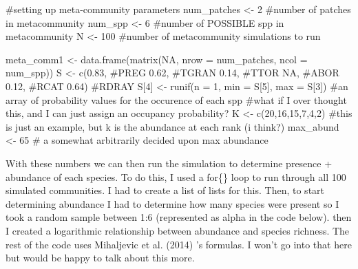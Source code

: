 \documentclass[
  letterpaper,
  DIV=11,
  numbers=noendperiod]{scrartcl}
\newenvironment{Shaded}{\begin{snugshade}}{\end{snugshade}}
\newcommand{\AttributeTok}[1]{\textcolor[rgb]{0.40,0.45,0.13}{#1}}
\newcommand{\CommentTok}[1]{\textcolor[rgb]{0.37,0.37,0.37}{#1}}
\newcommand{\ConstantTok}[1]{\textcolor[rgb]{0.56,0.35,0.01}{#1}}
\newcommand{\DecValTok}[1]{\textcolor[rgb]{0.68,0.00,0.00}{#1}}
\newcommand{\FloatTok}[1]{\textcolor[rgb]{0.68,0.00,0.00}{#1}}
\newcommand{\FunctionTok}[1]{\textcolor[rgb]{0.28,0.35,0.67}{#1}}
\newcommand{\NormalTok}[1]{\textcolor[rgb]{0.00,0.23,0.31}{#1}}
\newcommand{\OtherTok}[1]{\textcolor[rgb]{0.00,0.23,0.31}{#1}}
\begin{document}
\begin{Shaded}
\begin{Highlighting}[]
\CommentTok{\#setting up meta{-}community parameters}
\NormalTok{num\_patches }\OtherTok{\textless{}{-}} \DecValTok{2} \CommentTok{\#number of patches in metacommunity}
\NormalTok{num\_spp }\OtherTok{\textless{}{-}} \DecValTok{6} \CommentTok{\#number of POSSIBLE spp in metacommunity}
\NormalTok{N }\OtherTok{\textless{}{-}} \DecValTok{100} \CommentTok{\#number of metacommunity simulations to run}

\NormalTok{meta\_comm1 }\OtherTok{\textless{}{-}} \FunctionTok{data.frame}\NormalTok{(}\FunctionTok{matrix}\NormalTok{(}\ConstantTok{NA}\NormalTok{, }\AttributeTok{nrow =}\NormalTok{ num\_patches, }\AttributeTok{ncol =}\NormalTok{ num\_spp))}
\NormalTok{S }\OtherTok{\textless{}{-}} \FunctionTok{c}\NormalTok{(}\FloatTok{0.83}\NormalTok{, }\CommentTok{\#PREG}
       \FloatTok{0.62}\NormalTok{, }\CommentTok{\#TGRAN}
       \FloatTok{0.14}\NormalTok{, }\CommentTok{\#TTOR}
       \ConstantTok{NA}\NormalTok{, }\CommentTok{\#ABOR}
       \FloatTok{0.12}\NormalTok{, }\CommentTok{\#RCAT}
       \FloatTok{0.64}\NormalTok{) }\CommentTok{\#RDRAY}
\NormalTok{S[}\DecValTok{4}\NormalTok{] }\OtherTok{\textless{}{-}} \FunctionTok{runif}\NormalTok{(}\AttributeTok{n =} \DecValTok{1}\NormalTok{, }\AttributeTok{min =}\NormalTok{ S[}\DecValTok{5}\NormalTok{], }\AttributeTok{max =}\NormalTok{ S[}\DecValTok{3}\NormalTok{])}
\CommentTok{\#an array of probability values for the occurence of each spp}
\CommentTok{\#what if I over thought this, and I can just assign an occupancy probability?}
\NormalTok{K }\OtherTok{\textless{}{-}} \FunctionTok{c}\NormalTok{(}\DecValTok{20}\NormalTok{,}\DecValTok{16}\NormalTok{,}\DecValTok{15}\NormalTok{,}\DecValTok{7}\NormalTok{,}\DecValTok{4}\NormalTok{,}\DecValTok{2}\NormalTok{) }\CommentTok{\#this is just an example, but k is the abundance at each rank (i think?)}
\NormalTok{max\_abund }\OtherTok{\textless{}{-}} \DecValTok{65} \CommentTok{\# a somewhat arbitrarily decided upon max abundance}
\end{Highlighting}
\end{Shaded}

With these numbers we can then run the simulation to determine presence
+ abundance of each species. To do this, I used a for\{\} loop to run
through all 100 simulated communities. I had to create a list of lists
for this. Then, to start determining abundance I had to determine how
many species were present so I took a random sample between 1:6
(represented as alpha in the code below). then I created a logarithmic
relationship between abundance and species richness. The rest of the
code uses Mihaljevic et al. (2014) 's formulas. I won't go into that
here but would be happy to talk about this more.
\end{document}
